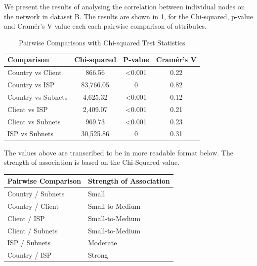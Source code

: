 \documentclass[conference]{IEEEtran}
\begin{document}
We present the results of analysing the correlation between individual nodes on the network in dataset B. The results are shown in \ref{tab:pairwise-comparisons}, for the Chi-squared, p-value and Cramér's V value each each pairwise comparison of attributes.

\begin{table}[h]
    \centering
    \renewcommand{\arraystretch}{1.5}
    \begin{tabular}{|p{2.5cm}|c|c|c|}
        \hline
        \textbf{Comparison} & \textbf{Chi-squared} & \textbf{P-value} & \textbf{Cramér's V} \\
        \hline
        Country vs Client & 866.56 & \textless 0.001 & 0.22 \\ \hline
        Country vs ISP & 83,766.05 & 0 & 0.82 \\ \hline
        Country vs Subnets & 4,625.32 & \textless 0.001 & 0.12 \\ \hline
        Client vs ISP & 2,409.07 & \textless 0.001 & 0.21 \\ \hline
        Client vs Subnets & 969.73 & \textless 0.001 & 0.23 \\ \hline
        ISP vs Subnets & 30,525.86 & 0 & 0.31 \\ \hline
    \end{tabular}
    \vspace{10pt}
    \caption{Pairwise Comparisons with Chi-squared Test Statistics}
    \label{tab:pairwise-comparisons}
\end{table}

The values above are transcribed to be in more readable format below.  The strength of association is based on the Chi-Squared value.

\begin{table}[htbp]
    \centering
    \normalsize
    \begin{tabular}{p{4cm}p{4cm}}
        \toprule
        Pairwise Comparison & Strength of Association \\
        \midrule
        Country / Subnets & Small \\
        Country / Client & Small-to-Medium \\
        Client / ISP & Small-to-Medium \\
        Client / Subnets & Small-to-Medium \\
        ISP / Subnets & Moderate \\
        Country / ISP & Strong \\
        \bottomrule
    \end{tabular}
\end{table}
\end{document}
